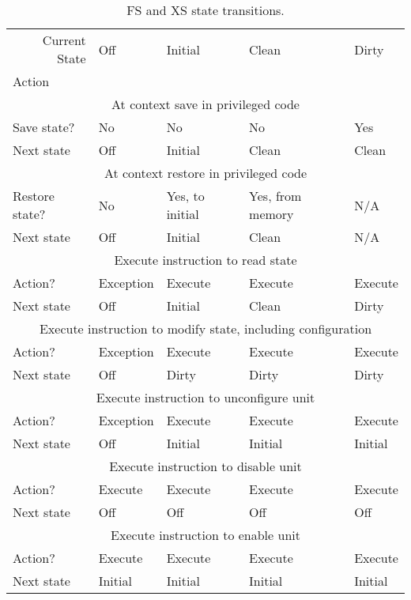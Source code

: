 \begin{table*}[h!]
\begin{center}
\begin{tabular}{|l|l|l|l|l|}
\hline
\multicolumn{1}{|r|}{Current State} & Off & Initial & Clean & Dirty \\
Action & & & &\\
\hline
\hline
\multicolumn{5}{|c|}{At context save in privileged code}\\
\hline	 
Save state?    & No         & No        & No     & Yes \\
Next state       & Off        & Initial   & Clean  & Clean \\
\hline
\hline
\multicolumn{5}{|c|}{At context restore in privileged code}\\
\hline
Restore state? & No        & Yes, to initial & Yes, from memory   & N/A \\
Next state     & Off       & Initial   & Clean  & N/A \\
\hline
\hline
\multicolumn{5}{|c|}{Execute instruction to read state}\\
\hline
Action?        & Exception & Execute   & Execute & Execute \\
Next state     & Off       & Initial   & Clean  & Dirty \\
\hline
\hline
\multicolumn{5}{|c|}{Execute instruction to modify state, including configuration}\\
\hline
Action?        & Exception & Execute & Execute & Execute \\
Next state     & Off       & Dirty   & Dirty  & Dirty \\
\hline
\hline
\multicolumn{5}{|c|}{Execute instruction to unconfigure unit}\\
\hline
Action?        & Exception & Execute & Execute & Execute \\
Next state     & Off       & Initial & Initial & Initial \\
\hline
\hline
\multicolumn{5}{|c|}{Execute instruction to disable unit}\\
\hline
Action?        & Execute   & Execute & Execute & Execute \\
Next state     & Off       & Off     & Off     & Off \\
\hline
\hline
\multicolumn{5}{|c|}{Execute instruction to enable unit}\\
\hline
Action?        & Execute   & Execute & Execute & Execute \\
Next state     & Initial   & Initial & Initial & Initial   \\
\hline
\end{tabular}
\end{center}
\caption{FS and XS state transitions.}
\label{fsxsstates}
\end{table*}


